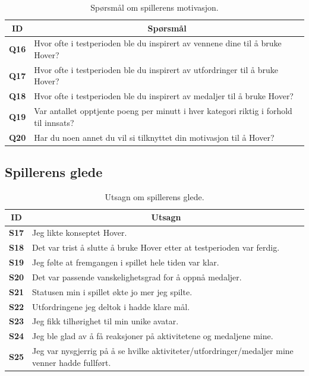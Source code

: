 \begin{table}[H]
    \centering
    \begin{tabularx}{\textwidth}{|c|X|}
        \hline
        \textbf{ID} & \multicolumn{1}{c|}{\textbf{Spørsmål}} \\ \hline
        \textbf{Q16} & Hvor ofte i testperioden ble du inspirert av vennene dine til å bruke Hover?  \\ 
        \textbf{Q17} & Hvor ofte i testperioden ble du inspirert av utfordringer til å bruke Hover? \\ 
        \textbf{Q18} & Hvor ofte i testperioden ble du inspirert av medaljer til å bruke Hover?  \\
        \textbf{Q19} & Var antallet opptjente poeng per minutt i hver kategori riktig i forhold til innsats? \\
        \textbf{Q20} & Har du noen annet du vil si tilknyttet din motivasjon til å Hover? \\ \hline
    \end{tabularx}
    \caption{Spørsmål om spillerens motivasjon.}
    \label{tab:appendix_no_player_motivation_questions}
\end{table}

\subsection*{Spillerens glede}
\begin{table}[H]
    \centering
    \begin{tabularx}{\textwidth}{|c|X|}
        \hline
        \textbf{ID} & \multicolumn{1}{c|}{\textbf{Utsagn}} \\ \hline
    
        \textbf{S17} & Jeg likte konseptet Hover. \\
        \textbf{S18} & Det var trist å slutte å bruke Hover etter at testperioden var ferdig. \\
        \textbf{S19} & Jeg følte at fremgangen i spillet hele tiden var klar. \\
        \textbf{S20} & Det var passende vanskelighetsgrad for å oppnå medaljer. \\
        \textbf{S21} & Statusen min i spillet økte jo mer jeg spilte. \\
        \textbf{S22} & Utfordringene jeg deltok i hadde klare mål. \\
        \textbf{S23} & Jeg fikk tilhørighet til min unike avatar. \\
        \textbf{S24} & Jeg ble glad av å få reaksjoner på aktivitetene og medaljene mine. \\
        \textbf{S25} & Jeg var nysgjerrig på å se hvilke aktiviteter/utfordringer/medaljer mine venner hadde fullført. \\
        \hline
    \end{tabularx}
    \caption{Utsagn om spillerens glede.}
    \label{tab:appendix_no_player_enjoyment_statements}
\end{table}

